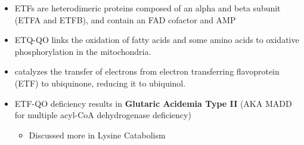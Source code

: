 \documentclass{scrartcl}
\begin{document}
\begin{itemize}
\item ETFs are heterodimeric proteins composed of an alpha and beta
subunit (ETFA and ETFB), and contain an FAD cofactor and AMP

\item ETQ-QO links the oxidation of fatty acids and some amino acids to
oxidative phosphorylation in the mitochondria.
\item catalyzes the transfer of electrons from electron transferring
flavoprotein (ETF) to ubiquinone, reducing it to ubiquinol.
\end{itemize}

{\small{}}

\begin{itemize}
\item ETF-QO deficiency results in \textbf{Glutaric Acidemia Type II} (AKA MADD
for multiple acyl-CoA dehydrogenase deficiency)
\begin{itemize}
\item Discussed more in Lysine Catabolism
\end{itemize}
\end{itemize}
\end{document}
